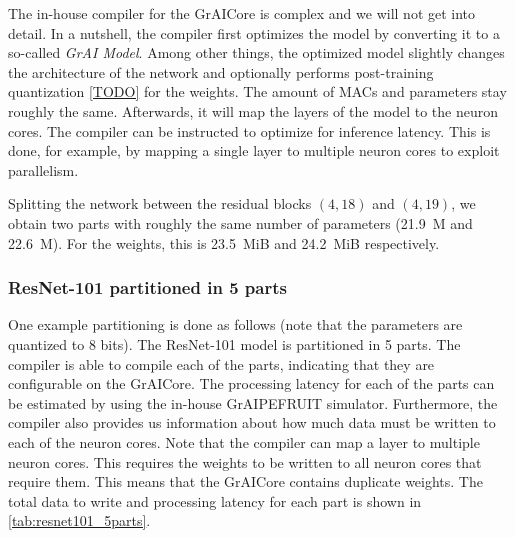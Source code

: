 The in-house compiler for the GrAICore is complex and we will not get into detail.
In a nutshell, the compiler first optimizes the model by converting it to a so-called \textit{GrAI Model}.
Among other things, the optimized model slightly changes the architecture of the network and optionally performs post-training quantization \cref{TODO} for the weights.
The amount of MACs and parameters stay roughly the same.
Afterwards, it will map the layers of the model to the neuron cores.
The compiler can be instructed to optimize for inference latency.
This is done, for example, by mapping a single layer to multiple neuron cores to exploit parallelism.

Splitting the network between the residual blocks $(4, 18)$ and $(4, 19)$, we obtain two parts with roughly the same number of parameters (\SI{21.9}{M} and \SI{22.6}{M}).
For the weights, this is \SI{23.5}{MiB} and \SI{24.2}{MiB} respectively.

\hrulefill


\subsubsection{ResNet-101 partitioned in 5 parts}
One example partitioning is done as follows (note that the parameters are quantized to 8 bits).
The ResNet-101 model is partitioned in 5 parts.
The compiler is able to compile each of the parts, indicating that they are configurable on the GrAICore.
The processing latency for each of the parts can be estimated by using the in-house GrAIPEFRUIT simulator.
Furthermore, the compiler also provides us information about how much data must be written to each of the neuron cores.
Note that the compiler can map a layer to multiple neuron cores.
This requires the weights to be written to all neuron cores that require them.
This means that the GrAICore contains duplicate weights.
The total data to write and processing latency for each part is shown in \cref{tab:resnet101_5parts}.


